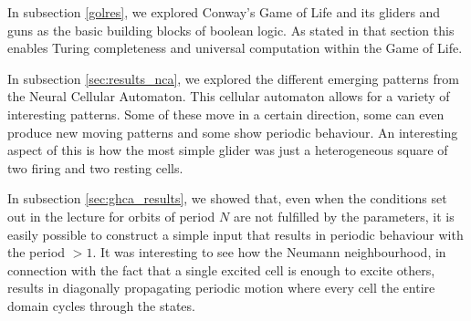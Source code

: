 In subsection \ref{golres}, we explored Conway's Game of Life and its gliders and guns as the basic building blocks of boolean logic.
As stated in that section this enables Turing completeness and universal computation within the Game of Life.

In subsection \ref{sec:results_nca}, we explored the different emerging patterns from the Neural Cellular Automaton.
This cellular automaton allows for a variety of interesting patterns. Some of these move in a certain direction, some can even produce new moving patterns
and some show periodic behaviour.
An interesting aspect of this is how the most simple glider was just a heterogeneous square of two firing and two resting cells.

In subsection \ref{sec:ghca_results}, we showed that, even when the conditions set out in the lecture for orbits of period $N$ are not fulfilled by the parameters, it is easily possible to construct a simple input that results in periodic behaviour with the period $>1$.
It was interesting to see how the Neumann neighbourhood, in connection with the fact that a single excited cell is enough to excite others, results in diagonally propagating periodic motion where every cell the entire domain cycles through the states.


